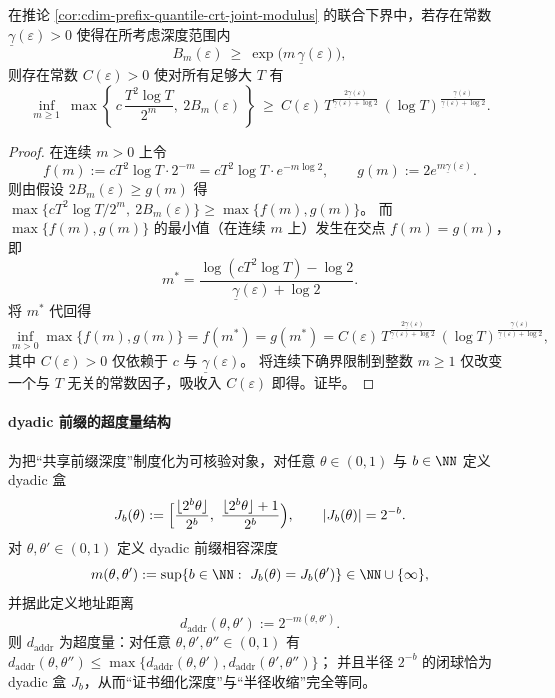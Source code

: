 \begin{corollary}[最小化模积阈值时的平衡深度尺度]\label{cor:cdim-optimal-depth-scale-modulus}
在推论 \ref{cor:cdim-prefix-quantile-crt-joint-modulus} 的联合下界中，若存在常数 \(\underline\gamma(\varepsilon)>0\) 使得在所考虑深度范围内
\[
B_m(\varepsilon)\ \ge\ \exp\!\bigl(m\,\underline\gamma(\varepsilon)\bigr),
\]
则存在常数 \(C(\varepsilon)>0\) 使对所有足够大 \(T\) 有
\[
\inf_{m\ge 1}\ \max\!\left\{\, c\,\frac{T^2\log T}{2^m},\ 2B_m(\varepsilon)\,\right\}
\ \ge\
C(\varepsilon)\,
T^{\frac{2\underline\gamma(\varepsilon)}{\underline\gamma(\varepsilon)+\log 2}}\,
(\log T)^{\frac{\underline\gamma(\varepsilon)}{\underline\gamma(\varepsilon)+\log 2}}.
\]
\end{corollary}
\begin{proof}
在连续 \(m>0\) 上令
\[
f(m):=cT^2\log T\cdot 2^{-m}=cT^2\log T\cdot e^{-m\log 2},
\qquad
g(m):=2e^{m\underline\gamma(\varepsilon)}.
\]
则由假设 \(2B_m(\varepsilon)\ge g(m)\) 得
\(
\max\{cT^2\log T/2^m,\ 2B_m(\varepsilon)\}\ge \max\{f(m),g(m)\}
\)。
而 \(\max\{f(m),g(m)\}\) 的最小值（在连续 \(m\) 上）发生在交点 \(f(m)=g(m)\)，即
\[
m^\ast=\frac{\log(cT^2\log T)-\log 2}{\underline\gamma(\varepsilon)+\log 2}.
\]
将 \(m^\ast\) 代回得
\[
\inf_{m>0}\max\{f(m),g(m)\}
=f(m^\ast)=g(m^\ast)
=C(\varepsilon)\,
T^{\frac{2\underline\gamma(\varepsilon)}{\underline\gamma(\varepsilon)+\log 2}}\,
(\log T)^{\frac{\underline\gamma(\varepsilon)}{\underline\gamma(\varepsilon)+\log 2}},
\]
其中 \(C(\varepsilon)>0\) 仅依赖于 \(c\) 与 \(\underline\gamma(\varepsilon)\)。
将连续下确界限制到整数 \(m\ge 1\) 仅改变一个与 \(T\) 无关的常数因子，吸收入 \(C(\varepsilon)\) 即得。证毕。
\end{proof}

\paragraph{dyadic 前缀的超度量结构}
为把“共享前缀深度”制度化为可核验对象，对任意 \(\theta\in(0,1)\) 与 \(b\in\NN\) 定义 dyadic 盒
\[
J_b(\theta):=\Bigl[\frac{\lfloor 2^b\theta\rfloor}{2^b},\ \frac{\lfloor 2^b\theta\rfloor+1}{2^b}\Bigr),
\qquad
|J_b(\theta)|=2^{-b}.
\]
对 \(\theta,\theta'\in(0,1)\) 定义 dyadic 前缀相容深度
\[
m(\theta,\theta'):=\sup\{b\in\NN:\ J_b(\theta)=J_b(\theta')\}\in\NN\cup\{\infty\},
\]
并据此定义地址距离
\[
d_{\mathrm{addr}}(\theta,\theta'):=2^{-m(\theta,\theta')}.
\]
则 \(d_{\mathrm{addr}}\) 为超度量：对任意 \(\theta,\theta',\theta''\in(0,1)\) 有
\(
d_{\mathrm{addr}}(\theta,\theta'')\le \max\{d_{\mathrm{addr}}(\theta,\theta'),d_{\mathrm{addr}}(\theta',\theta'')\}
\)；
并且半径 \(2^{-b}\) 的闭球恰为 dyadic 盒 \(J_b\)，从而“证书细化深度”与“半径收缩”完全等同。

